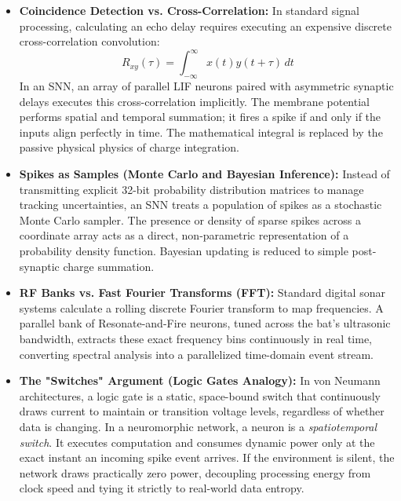 \begin{itemize}
    \item \textbf{Coincidence Detection vs. Cross-Correlation:} In standard signal processing, calculating an echo delay requires executing an expensive discrete cross-correlation convolution:
    \begin{equation}
        R_{xy}(\tau) = \int_{-\infty}^{\infty} x(t)y(t+\tau) \, dt
    \end{equation}
    In an SNN, an array of parallel LIF neurons paired with asymmetric synaptic delays executes this cross-correlation implicitly. The membrane potential performs spatial and temporal summation; it fires a spike if and only if the inputs align perfectly in time. The mathematical integral is replaced by the passive physical physics of charge integration.
    
    \item \textbf{Spikes as Samples (Monte Carlo and Bayesian Inference):} Instead of transmitting explicit 32-bit probability distribution matrices to manage tracking uncertainties, an SNN treats a population of spikes as a stochastic Monte Carlo sampler. The presence or density of sparse spikes across a coordinate array acts as a direct, non-parametric representation of a probability density function. Bayesian updating is reduced to simple post-synaptic charge summation.
    
    \item \textbf{RF Banks vs. Fast Fourier Transforms (FFT):} Standard digital sonar systems calculate a rolling discrete Fourier transform to map frequencies. A parallel bank of Resonate-and-Fire neurons, tuned across the bat's ultrasonic bandwidth, extracts these exact frequency bins continuously in real time, converting spectral analysis into a parallelized time-domain event stream.
    
    \item \textbf{The "Switches" Argument (Logic Gates Analogy):} In von Neumann architectures, a logic gate is a static, space-bound switch that continuously draws current to maintain or transition voltage levels, regardless of whether data is changing. In a neuromorphic network, a neuron is a \textit{spatiotemporal switch}. It executes computation and consumes dynamic power only at the exact instant an incoming spike event arrives. If the environment is silent, the network draws practically zero power, decoupling processing energy from clock speed and tying it strictly to real-world data entropy.
\end{itemize}

